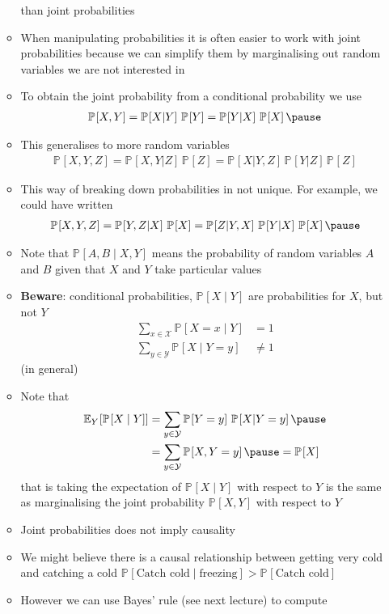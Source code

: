 \documentclass[11pt]{article}
\newcommand{\av}[2][]{\mathbb{E}_{#1\!}\left[ #2 \right]}
\newcommand{\Prob}[2][]{\mathbb{P}_{#1\!}\left[ #2 \right]}
\begin{document}
\begin{itemize}
\begin{itemize}
than joint probabilities
\item When manipulating probabilities it is often easier to work
with joint probabilities because we can simplify them by
marginalising out random variables we are not interested in
\item To obtain the joint probability from a conditional probability
we use
\begin{align*}
  \Prob{X,Y} = \Prob{X|Y}\,\Prob{Y} = \Prob{Y|X}\,\Prob{X}\pause
\end{align*}
\item This generalises to more random variables
\begin{align*}
  \Prob{X,Y,Z} = \Prob{X,Y|Z}\, \Prob{Z}
  = \Prob{X|Y,Z}\,\Prob{Y|Z}\,\Prob{Z}
\end{align*}
\item This way of breaking down probabilities in not unique. For
example, we could have written
\begin{align*}
  \Prob{X,Y,Z} = \Prob{Y,Z|X}\, \Prob{X}
  = \Prob{Z|Y,X}\,\Prob{Y|X}\,\Prob{X}\pause
\end{align*}
\item Note that \(\Prob{A,B \mid X,Y}\) means the probability of
random variables \(A\) and \(B\) given that \(X\) and \(Y\) take
particular values
\item \textbf{Beware}: conditional probabilities, \(\Prob{X\mid Y}\) are probabilities
for \(X\), but not \(Y\)
\begin{align*}
  \sum_{x\in\mathcal{X}} \Prob{X=x\mid Y} &= 1 \\
  \sum_{y\in\mathcal{Y}} \Prob{X\mid Y=y} &\neq 1
\end{align*}
(in general)
\item Note that
\begin{align*}
  \av[Y]{\Prob{X\mid Y}} &= \sum_{y\in\mathcal{Y}} \Prob{Y=y}\,
                           \Prob{X|Y=y}\pause \\
  &= \sum_{y\in\mathcal{Y}} \Prob{X,Y=y}\pause = \Prob{X}
\end{align*}
that is taking the expectation of \(\Prob{X\mid Y}\) with respect
to \(Y\) is the same as marginalising the joint probability
\(\Prob{X,Y}\) with respect to \(Y\)
\item Joint probabilities does not imply causality
\item We might believe there is a causal relationship between getting
very cold and catching a cold \(\Prob{\text{Catch cold} \mid
      \text{freezing}} > \Prob{\text{Catch cold}}\)
\item However we can use Bayes' rule (see next lecture) to compute

\end{itemize}
\end{itemize}
\end{document}
